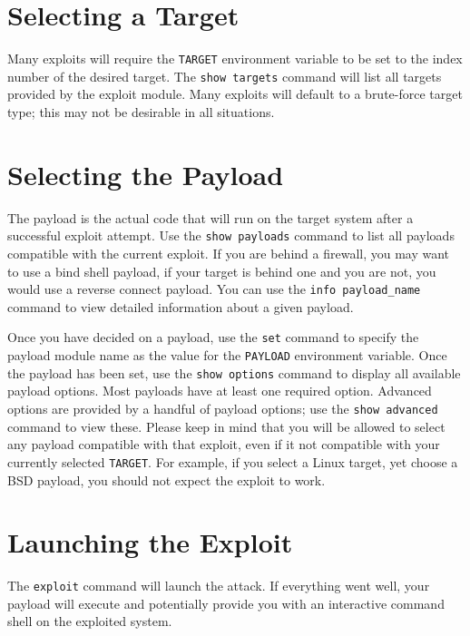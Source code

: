 \documentclass{report}
\begin{document}
	\section{Selecting a Target}

\par Many exploits will require the \texttt{TARGET} environment variable to be
set to the index number of the desired target. The \texttt{show targets}
command will list all targets provided by the exploit module. Many exploits
will default to a brute-force target type; this may not be desirable in all
situations. 

	\section{Selecting the Payload}

\par	The payload is the actual code that will run on the target system after
a successful exploit attempt. Use the \texttt{show payloads} command to list
all payloads compatible with the current exploit. If you are behind a
firewall, you may want to use a bind shell payload, if your target is behind
one and you are not, you would use a reverse connect payload. You can use the
\texttt{info payload\_name} command to view detailed information about a given
payload.  

\par
Once you have decided on a payload, use the \texttt{set} command to specify
the payload module name as the value for the \texttt{PAYLOAD} environment
variable. Once the payload has been set, use the \texttt{show options} command
to display all available payload options. Most payloads have at least one
required option. Advanced options are provided by a handful of payload
options; use the \texttt{show advanced} command to view these. Please keep in
mind that you will be allowed to select any payload compatible with that
exploit, even if it not compatible with your currently selected
\texttt{TARGET}. For example, if you select a Linux target, yet choose a BSD
payload, you should not expect the exploit to work.

	\section{Launching the Exploit}

\par The \texttt{exploit} command will launch the attack. If everything went
well, your payload will execute and potentially provide you with an
interactive command shell on the exploited system. 
\end{document}
